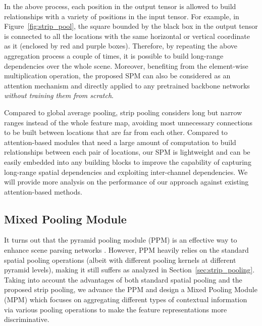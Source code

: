 \documentclass[final]{cvpr}
\begin{document}
In the above process, each position in the output tensor is allowed to build relationships with a variety of positions in the input tensor.
For example, in Figure~\ref{fig:strip_pool}, the square bounded by the black box in the output tensor is connected to all the locations with the same horizontal or vertical coordinate as it
(enclosed by red and purple boxes).
Therefore, by repeating the above aggregation process a couple of times, it is possible to build long-range dependencies over the whole scene.
Moreover, benefiting from the element-wise multiplication 
operation, the proposed SPM can also be considered as an 
attention mechanism and directly applied to any pretrained 
backbone networks \emph{without training them
from scratch}. 


Compared to global average pooling, strip pooling considers long but narrow ranges instead of the whole feature map, 
avoiding most unnecessary connections to be built between locations that are far from each other.
Compared to attention-based modules \cite{fu2019dual,he2019adaptive}
that need a large amount of computation to build relationships between each pair of locations, our SPM is lightweight and can be easily embedded into any building blocks to improve the capability of capturing long-range spatial dependencies and exploiting inter-channel dependencies.
We will provide more analysis on the performance of our approach against existing attention-based methods.

\subsection{Mixed Pooling Module} \label{sec:mpmodule}

It turns out that the pyramid pooling module (PPM) 
is an effective way to enhance scene parsing networks \cite{zhao2016pyramid}.
However, PPM heavily relies on the standard spatial
pooling operations (albeit with different pooling kernels at different pyramid levels), making it still suffers as analyzed in Section~\ref{sec:strip_pooling}.
Taking into account the advantages of both standard
spatial pooling and the proposed strip pooling, 
we advance the PPM and design a Mixed Pooling
Module (MPM) which focuses on aggregating different 
types of contextual information via various pooling 
operations to make the feature representations
more discriminative.
\end{document}
